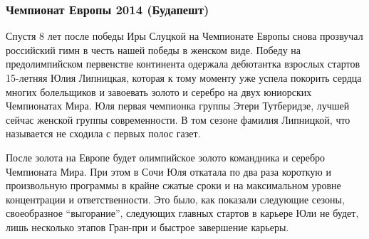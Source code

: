  
 
 
 
 
\subsubsection{Чемпионат Европы 2014 (Будапешт)}
\label{sec:04_01_2022.yz.figurka_ot_maksima_jagudina.1.chempionaty_evropy.4.budapest_2014}


Спустя 8 лет после победы Иры Слуцкой на Чемпионате Европы снова прозвучал
российский гимн в честь нашей победы в женском виде. Победу на предолимпийском
первенстве континента одержала дебютантка взрослых стартов 15-летняя Юлия
Липницкая, которая к тому моменту уже успела покорить сердца многих болельщиков
и завоевать золото и серебро на двух юниорских Чемпионатах Мира. Юля первая
чемпионка группы Этери Тутберидзе, лучшей сейчас женской группы современности.
В том сезоне фамилия Липницкой, что называется не сходила с первых полос газет.


После золота на Европе будет олимпийское золото командника и серебро Чемпионата
Мира. При этом в Сочи Юля откатала по два раза короткую и произвольную
программы в крайне сжатые сроки и на максимальном уровне концентрации и
ответственности. Это было, как показали следующие сезоны, своеобразное
\enquote{выгорание}, следующих главных стартов в карьере Юли не будет, лишь несколько
этапов Гран-при и быстрое завершение карьеры. 
